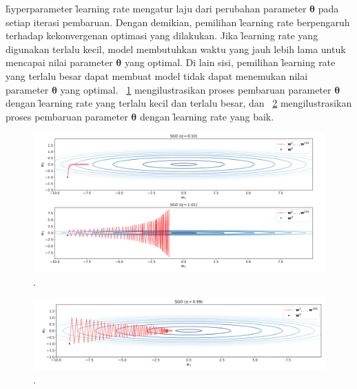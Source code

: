     \f{hyperparameter} \f{learning rate} mengatur laju dari perubahan parameter $\bm{\theta}$ pada setiap iterasi pembaruan. Dengan demikian, pemilihan \f{learning rate} berpengaruh terhadap kekonvergenan optimasi yang dilakukan. Jika \f{learning rate} yang digunakan terlalu kecil, model membutuhkan waktu yang jauh lebih lama untuk mencapai nilai parameter $\bm{\theta}$ yang optimal. Di lain sisi, pemilihan \f{learning rate} yang terlalu besar dapat membuat model tidak dapat menemukan nilai parameter $\bm{\theta}$ yang optimal. \pic~\ref{fig:learning-rate-bad} mengilustrasikan proses pembaruan parameter $\bm{\theta}$ dengan \f{learning rate} yang terlalu kecil dan terlalu besar, dan \pic~\ref{fig:learning-rate-good} mengilustrasikan proses pembaruan parameter $\bm{\theta}$ dengan \f{learning rate} yang baik.
\begin{figure}
    \centering
    \includegraphics[width=1\textwidth]{assets/pics/learning-rate-bad.png}
    \caption{\license.}
    \label{fig:learning-rate-bad}
\end{figure}
\begin{figure}
    \centering
    \includegraphics[width=1\textwidth]{assets/pics/learning-rate-good.png}
    \caption{\license.}
    \label{fig:learning-rate-good}
\end{figure}

